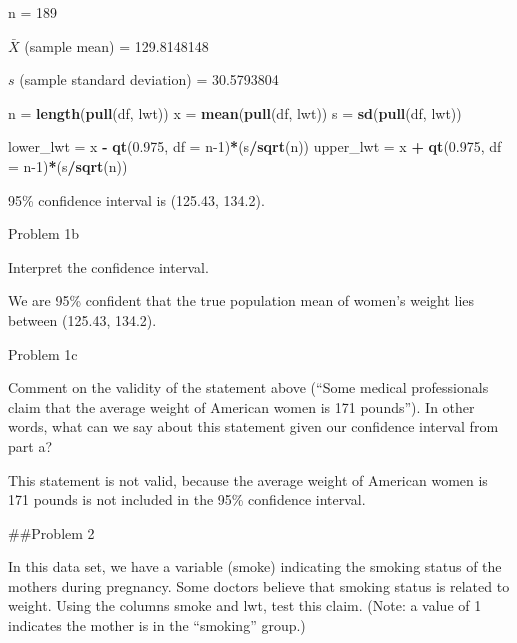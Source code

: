 \documentclass[
]{article}
\newenvironment{Shaded}{\begin{snugshade}}{\end{snugshade}}
\newcommand{\AttributeTok}[1]{\textcolor[rgb]{0.13,0.29,0.53}{#1}}
\newcommand{\DecValTok}[1]{\textcolor[rgb]{0.00,0.00,0.81}{#1}}
\newcommand{\FloatTok}[1]{\textcolor[rgb]{0.00,0.00,0.81}{#1}}
\newcommand{\FunctionTok}[1]{\textcolor[rgb]{0.13,0.29,0.53}{\textbf{#1}}}
\newcommand{\NormalTok}[1]{#1}
\newcommand{\OtherTok}[1]{\textcolor[rgb]{0.56,0.35,0.01}{#1}}
\newcommand{\SpecialCharTok}[1]{\textcolor[rgb]{0.81,0.36,0.00}{\textbf{#1}}}
\begin{document}
n = 189

\(\bar{X}\) (sample mean) = 129.8148148

\(s\) (sample standard deviation) = 30.5793804

\begin{Shaded}
\begin{Highlighting}[]
\NormalTok{n }\OtherTok{=} \FunctionTok{length}\NormalTok{(}\FunctionTok{pull}\NormalTok{(df, lwt))}
\NormalTok{x }\OtherTok{=} \FunctionTok{mean}\NormalTok{(}\FunctionTok{pull}\NormalTok{(df, lwt))}
\NormalTok{s }\OtherTok{=} \FunctionTok{sd}\NormalTok{(}\FunctionTok{pull}\NormalTok{(df, lwt))}
\end{Highlighting}
\end{Shaded}

\begin{Shaded}
\begin{Highlighting}[]
\NormalTok{lower\_lwt }\OtherTok{=}\NormalTok{ x }\SpecialCharTok{{-}} \FunctionTok{qt}\NormalTok{(}\FloatTok{0.975}\NormalTok{, }\AttributeTok{df =}\NormalTok{ n}\DecValTok{{-}1}\NormalTok{)}\SpecialCharTok{*}\NormalTok{(s}\SpecialCharTok{/}\FunctionTok{sqrt}\NormalTok{(n))}
\NormalTok{upper\_lwt }\OtherTok{=}\NormalTok{ x }\SpecialCharTok{+} \FunctionTok{qt}\NormalTok{(}\FloatTok{0.975}\NormalTok{, }\AttributeTok{df =}\NormalTok{ n}\DecValTok{{-}1}\NormalTok{)}\SpecialCharTok{*}\NormalTok{(s}\SpecialCharTok{/}\FunctionTok{sqrt}\NormalTok{(n))}
\end{Highlighting}
\end{Shaded}

95\% confidence interval is (125.43, 134.2).

Problem 1b

Interpret the confidence interval.

We are 95\% confident that the true population mean of women's weight
lies between (125.43, 134.2).

Problem 1c

Comment on the validity of the statement above (``Some medical
professionals claim that the average weight of American women is 171
pounds''). In other words, what can we say about this statement given
our confidence interval from part a?

This statement is not valid, because the average weight of American
women is 171 pounds is not included in the 95\% confidence interval.

\#\#Problem 2

In this data set, we have a variable (smoke) indicating the smoking
status of the mothers during pregnancy. Some doctors believe that
smoking status is related to weight. Using the columns smoke and lwt,
test this claim. (Note: a value of 1 indicates the mother is in the
``smoking'' group.)
\end{document}

